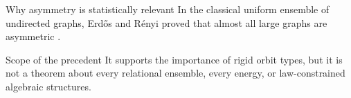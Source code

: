 \begin{frame}{Why asymmetry is statistically relevant}
  In the classical uniform ensemble of undirected graphs, Erd\H{o}s and
  R\'enyi proved that almost all large graphs are asymmetric
  \cite{erdosrenyi1963}.

  \vspace{0.5em}
  \begin{center}
  \end{center}

  \begin{block}{Scope of the precedent}
    It supports the importance of rigid orbit types, but it is not a theorem
    about every relational ensemble, every energy, or law-constrained algebraic
    structures.
  \end{block}
\end{frame}
